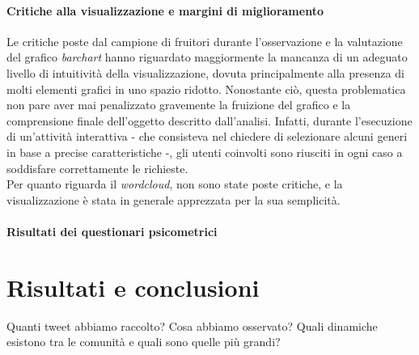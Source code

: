 \documentclass[12pt, a4paper, twocolumn]{article} %
\begin{document}
\subsection{Critiche alla visualizzazione e margini di miglioramento}
Le critiche poste dal campione di fruitori durante l'osservazione e la valutazione del grafico \textit{barchart} hanno riguardato maggiormente la mancanza di un adeguato livello di intuitività della visualizzazione, dovuta principalmente alla presenza di molti elementi grafici in uno spazio ridotto. Nonostante ciò, questa problematica non pare aver mai penalizzato gravemente la fruizione del grafico e la comprensione finale dell'oggetto descritto dall'analisi. Infatti, durante l'esecuzione di un'attività interattiva - che consisteva nel chiedere di selezionare alcuni generi in base a precise caratteristiche -, gli utenti coinvolti sono riusciti in ogni caso a soddisfare correttamente le richieste. \\
Per quanto riguarda il \textit{wordcloud}, non sono state poste critiche, e la visualizzazione è stata in generale apprezzata per la sua semplicità.

\subsection{Risultati dei questionari psicometrici}

\hfill
\newpage
\part{Risultati e conclusioni}
Quanti tweet abbiamo raccolto? Cosa abbiamo osservato? Quali dinamiche esistono tra le comunità e quali sono quelle più grandi?



\hfill
\newpage
\printbibliography[title={Bibliografia e sitografia}]

\end{document}
